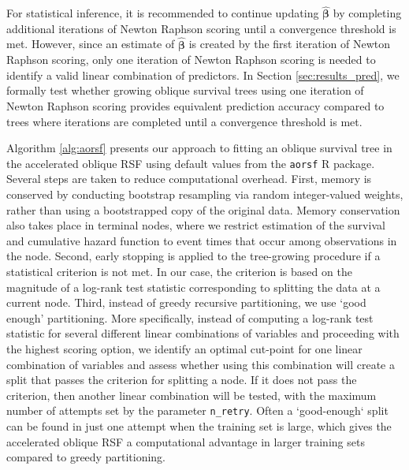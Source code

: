 \documentclass[12pt]{article}\usepackage[]{graphicx}\usepackage[]{xcolor}
\newcommand{\secref}[1]{Section \ref{#1}}
\begin{document}
For statistical inference, it is recommended to continue updating $\hat{\bm{\beta}}$ by completing additional iterations of Newton Raphson scoring until a convergence threshold is met. However, since an estimate of $\hat{\bm{\beta}}$ is created by the first iteration of Newton Raphson scoring, only one iteration of Newton Raphson scoring is needed to identify a valid linear combination of predictors. In \secref{sec:results_pred}, we formally test whether growing oblique survival trees using one iteration of Newton Raphson scoring provides equivalent prediction accuracy compared to trees where iterations are completed until a convergence threshold is met.

Algorithm \ref{alg:aorsf} presents our approach to fitting an oblique survival tree in the accelerated oblique RSF using default values from the \texttt{aorsf} R package. Several steps are taken to reduce computational overhead. First, memory is conserved by conducting bootstrap resampling via random integer-valued weights, rather than using a bootstrapped copy of the original data. Memory conservation also takes place in terminal nodes, where we restrict estimation of the survival and cumulative hazard function to event times that occur among observations in the node. Second, early stopping is applied to the tree-growing procedure if a statistical criterion is not met. In our case, the criterion is based on the magnitude of a log-rank test statistic corresponding to splitting the data at a current node. Third, instead of greedy recursive partitioning, we use `good enough' partitioning. More specifically, instead of computing a log-rank test statistic for several different linear combinations of variables and proceeding with the highest scoring option, we identify an optimal cut-point for one linear combination of variables and assess whether using this combination will create a split that passes the criterion for splitting a node. If it does not pass the criterion, then another linear combination will be tested, with the maximum number of attempts set by the parameter \texttt{n\_retry}. Often a `good-enough` split can be found in just one attempt when the training set is large, which gives the accelerated oblique RSF a computational advantage in larger training sets compared to greedy partitioning.
\end{document}
